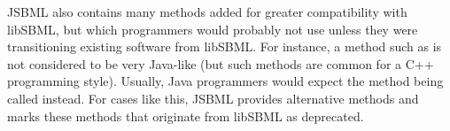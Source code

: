 JSBML also contains many methods added for greater compatibility with
libSBML, but which programmers would probably not use unless they were
transitioning existing software from libSBML.  For instance, a method such
as  is not considered to be very Java-like (but such
methods are common for a C++ programming style). Usually, Java
programmers would expect the method being called 
instead. For cases like this, JSBML provides alternative methods and marks
these methods that originate from libSBML as deprecated.
